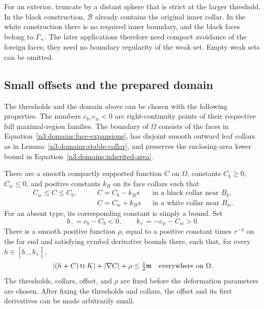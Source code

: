 For an exterior, truncate by a distant sphere that is strict at the
larger threshold.  In the black construction, $\mathcal B$ already
contains the original inner collar.  In the white construction there is
no required inner boundary, and the black faces belong to $\Gamma_+$.
The later applications therefore need compact avoidance of the foreign
faces; they need no boundary regularity of the weak set.  Empty weak sets
can be omitted.

\subsection{Small offsets and the prepared domain}

\begin{proposition}\label{n3:domains:prepared-domain}
The thresholds and the domain above can be chosen with the following
properties.  The numbers $c_b,c_w<0$ are right-continuity points of
their respective full maximal-region families.  The boundary of
$\Omega$ consists of the faces in
Equation~\eqref{n3:domains:face-expansions}, has disjoint smooth
outward leaf collars as in
Lemma~\ref{n3:domains:stable-collar}, and preserves the enclosing-area
lower bound in Equation~\eqref{n3:domains:inherited-area}.

There are a smooth compactly supported function $C$ on $\Omega$,
constants $C_b\geq0$, $C_w\leq0$, and positive constants $k_B$
on its face collars such that
\begin{equation}\label{n3:domains:offset-collars}
 \begin{aligned}
  C_w\leq C\leq C_b,&\qquad
  C=C_b-k_Bs&&\text{in a black collar near }B_b,\\
  &\qquad C=C_w+k_Bs&&\text{in a white collar near }B_w.
 \end{aligned}
\end{equation}
For an absent type, its corresponding constant is simply a bound.
Set
\begin{equation}\label{n3:domains:assigned-heights}
 b_-=c_b-C_b<0,
 \qquad b_+=-c_w-C_w>0.
\end{equation}
There is a smooth positive function $\rho$, equal to a positive
constant times $r^{-4}$ on the far end and satisfying symbol
derivative bounds there, such that, for every $h\in[b_-,b_+]$,
\begin{equation}\label{n3:domains:offset-smallness}
 |(h+C)\operatorname{tr} K|+|\nabla C|+\rho
      \leq\tfrac12\mathfrak m
 \quad\hbox{everywhere on }\Omega.
\end{equation}
The thresholds, collars, offset, and $\rho$ are fixed before the
deformation parameters are chosen.  After fixing the thresholds and
collars, the offset and its first derivatives can be made arbitrarily
small.
\end{proposition}

